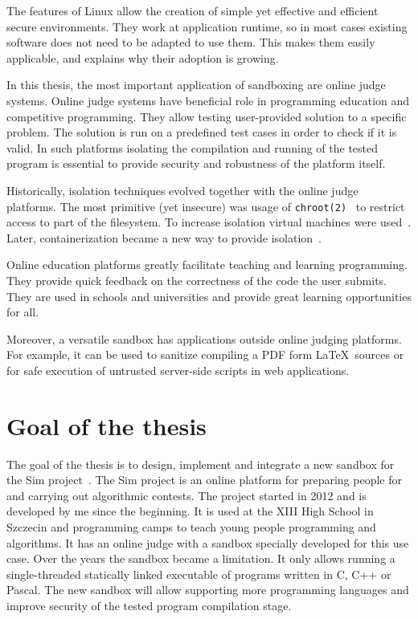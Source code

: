 \documentclass[en]{pracamgr}
\begin{document}
The features of Linux allow the creation of simple yet effective and efficient secure environments. They work at application runtime, so in most cases existing software does not need to be adapted to use them. This makes them easily applicable, and explains why their adoption is growing.

In this thesis, the most important application of sandboxing are online judge systems. Online judge systems have beneficial role in programming education and competitive programming. They allow testing user-provided solution to a specific problem. The solution is run on a predefined test cases in order to check if it is valid. In such platforms isolating the compilation and running of the tested program is essential to provide security and robustness of the platform itself.

Historically, isolation techniques evolved together with the online judge platforms. The most primitive (yet insecure) was usage of \texttt{chroot(2)}~\cite{prevelakis2001sandboxing} to restrict access to part of the filesystem. To increase isolation virtual machines were used~\cite{5635141}. Later, containerization became a new way to provide isolation~\cite{marevs2012new, SPACEK20151665}.

Online education platforms greatly facilitate teaching and learning programming. They provide quick feedback on the correctness of the code the user submits. They are used in schools and universities and provide great learning opportunities for all.

Moreover, a versatile sandbox has applications outside online judging platforms. For example, it can be used to sanitize compiling a PDF form \LaTeX~sources or for safe execution of untrusted server-side scripts in web applications.

\section{Goal of the thesis}

The goal of the thesis is to design, implement and integrate a new sandbox for the Sim project~\cite{sim_project}. The Sim project is an online platform for preparing people for and carrying out algorithmic contests. The project started in 2012 and is developed by me since the beginning. It is used at the XIII High School in Szczecin and programming camps to teach young people programming and algorithms. It has an online judge with a sandbox specially developed for this use case. Over the years the sandbox became a limitation. It only allows running a single-threaded statically linked executable of programs written in C, C++ or Pascal. The new sandbox will allow supporting more programming languages and improve security of the tested program compilation stage.
\end{document}
